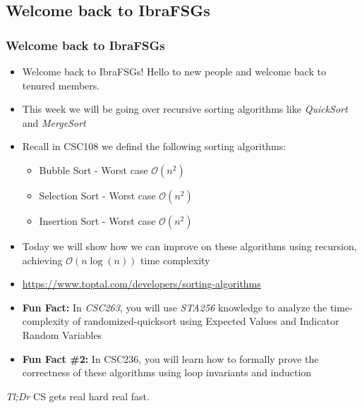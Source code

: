\documentclass[hyperref={colorlinks,citecolor=blue,linkcolor=blue,urlcolor=blue}, aspectratio=1610]{beamer}
\begin{document}
\subsection{Welcome back to IbraFSGs\texttrademark{}}
\begin{frame}
    \frametitle{Welcome back to IbraFSGs\texttrademark{}}
    \begin{itemize}
        \item Welcome back to IbraFSGs\texttrademark{}! Hello to new people and welcome back to tenured members.
        \item This week we will be going over recursive sorting algorithms like \textit{QuickSort} and \textit{MergeSort}
        \item Recall in CSC108 we defind the following sorting algorithms:
        \begin{itemize}
            \item Bubble Sort - Worst case $\mathcal{O}(n^2)$
            \item Selection Sort - Worst case $\mathcal{O}(n^2)$
            \item Insertion Sort - Worst case $\mathcal{O}(n^2)$
        \end{itemize}
        \pause
        \item Today we will show how we can improve on these algorithms using recursion, achieving $\mathcal{O}(n\log(n))$ time complexity
        \item \url{https://www.toptal.com/developers/sorting-algorithms}
        \pause
        \item \textbf{Fun Fact:} In \textit{CSC263}, you will use \textit{STA256} knowledge to analyze the time-complexity of randomized-quicksort using Expected Values and Indicator Random Variables
        \pause
        \item \textbf{Fun Fact \#2:} In CSC236, you will learn how to formally prove the correctness of these algorithms using loop invariants and induction
    \end{itemize}   
    \begin{center}
      \textit{Tl;Dr} CS gets real hard real fast.      
    \end{center}
\end{frame}
\end{document}
